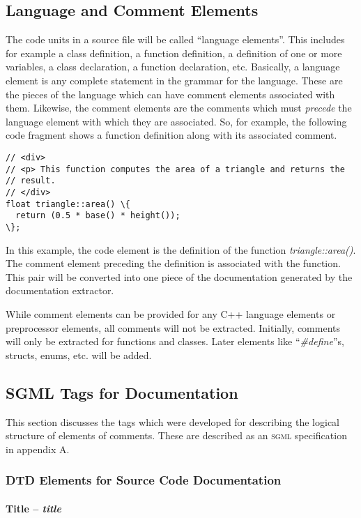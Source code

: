 \subsection{Language and Comment Elements}

The code units in a source file will be called ``language elements''.
This includes for example a class definition, a function definition, a 
definition of one or more variables, a class declaration, a function 
declaration, etc. Basically, a language element is any complete statement in 
the grammar for the language. These are the pieces of the language which can 
have comment elements associated with them. Likewise, the comment elements 
are the comments which must \emph{precede} the language element 
with which they are associated. So, for example, the following code 
fragment shows a function definition along with its associated comment.
\begin{verbatim}
// <div>
// <p> This function computes the area of a triangle and returns the
// result.
// </div>
float triangle::area() \{
  return (0.5 * base() * height());
\};
\end{verbatim}
\noindent
In this example, the code element is the definition of the function
\emph{triangle::area()}. The comment element preceding the definition
is associated with the function. This pair will be converted into one
piece of the documentation generated by the documentation extractor.

While comment elements can be provided for any C++ language elements
or preprocessor elements, all comments will not be extracted. Initially,
comments will only be extracted for functions and classes. Later 
elements like ``\emph{\#define}''s, structs, enums, etc. will be added.

\subsection{SGML Tags for Documentation}

This section discusses the tags which were developed for describing
the logical structure of elements of comments. These are described as
an \textsc{sgml} specification in appendix A.

\subsubsection{DTD Elements for Source Code Documentation}

\paragraph{Title -- \textit{title}}

